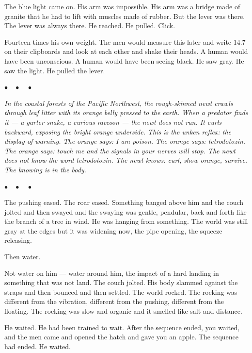 \documentclass[12pt, letterpaper]{article}
\begin{document}
The blue light came on. His arm was impossible. His arm was a bridge made of granite that he had to lift with muscles made of rubber. But the lever was there. The lever was always there. He reached. He pulled. Click.

Fourteen times his own weight. The men would measure this later and write 14.7 on their clipboards and look at each other and shake their heads. A human would have been unconscious. A human would have been seeing black. He saw gray. He saw the light. He pulled the lever.

\begin{center}
$\bullet\quad\bullet\quad\bullet$
\end{center}

\textit{In the coastal forests of the Pacific Northwest, the rough-skinned newt crawls through leaf litter with its orange belly pressed to the earth. When a predator finds it --- a garter snake, a curious raccoon --- the newt does not run. It curls backward, exposing the bright orange underside. This is the unken reflex: the display of warning. The orange says: I am poison. The orange says: tetrodotoxin. The orange says: touch me and the signals in your nerves will stop. The newt does not know the word tetrodotoxin. The newt knows: curl, show orange, survive. The knowing is in the body.}

\begin{center}
$\bullet\quad\bullet\quad\bullet$
\end{center}

The pushing eased. The roar eased. Something banged above him and the couch jolted and then swayed and the swaying was gentle, pendular, back and forth like the branch of a tree in wind. He was hanging from something. The world was still gray at the edges but it was widening now, the pipe opening, the squeeze releasing.

Then water.

Not water on him --- water around him, the impact of a hard landing in something that was not land. The couch jolted. His body slammed against the straps and then bounced and then settled. The world rocked. The rocking was different from the vibration, different from the pushing, different from the floating. The rocking was slow and organic and it smelled like salt and distance.

He waited. He had been trained to wait. After the sequence ended, you waited, and the men came and opened the hatch and gave you an apple. The sequence had ended. He waited.
\end{document}
